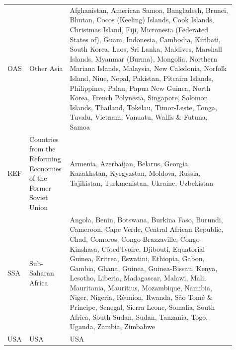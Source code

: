\begin{longtable}{>{\raggedright\arraybackslash}p{0.06\linewidth}>{\raggedright\arraybackslash}p{0.15\linewidth}>{\raggedright\arraybackslash}p{0.7\linewidth}}
OAS & Other Asia & Afghanistan, American Samoa, Bangladesh, Brunei, Bhutan, Cocos (Keeling) Islands, Cook Islands, Christmas Island, Fiji, Micronesia (Federated States of), Guam, Indonesia, Cambodia, Kiribati, South Korea, Laos, Sri Lanka, Maldives, Marshall Islands, Myanmar (Burma), Mongolia, Northern Mariana Islands, Malaysia, New Caledonia, Norfolk Island, Niue, Nepal, Pakistan, Pitcairn Islands, Philippines, Palau, Papua New Guinea, North Korea, French Polynesia, Singapore, Solomon Islands, Thailand, Tokelau, Timor-Leste, Tonga, Tuvalu, Vietnam, Vanuatu, Wallis \& Futuna, Samoa \\
REF & Countries from the Reforming Economies of the Former Soviet Union & Armenia, Azerbaijan, Belarus, Georgia, Kazakhstan, Kyrgyzstan, Moldova, Russia, Tajikistan, Turkmenistan, Ukraine, Uzbekistan \\
SSA & Sub-Saharan Africa & Angola, Benin, Botswana, Burkina Faso, Burundi, Cameroon, Cape Verde, Central African Republic, Chad, Comoros, Congo-Brazzaville, Congo-Kinshasa, Côted'Ivoire, Djibouti, Equatorial Guinea, Eritrea, Eswatini, Ethiopia, Gabon, Gambia, Ghana, Guinea, Guinea-Bissau, Kenya, Lesotho, Liberia, Madagascar, Malawi, Mali, Mauritania, Mauritius, Mozambique, Namibia, Niger, Nigeria, Réunion, Rwanda, São Tomé \& Príncipe, Senegal, Sierra Leone, Somalia, South Africa, South Sudan, Sudan, Tanzania, Togo, Uganda, Zambia, Zimbabwe \\
USA & USA & USA \\
\end{longtable}
